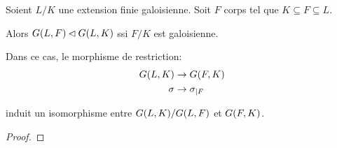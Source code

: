 \begin{proposition}
	Soient $L/K$ une extension finie galoisienne. Soit $F$ corps tel que $K
	\subseteq F \subseteq L$.

	Alors $G(L, F) \lhd G(L, K)$ ssi $F/K$ est
	galoisienne.

	Dans ce cas, le morphisme de restriction:
	\begin{align*}
		G(L, K) &\rightarrow G(F, K) \\
		\sigma &\rightarrow \sigma_{|F}
	\end{align*}

	induit un isomorphisme entre $G(L, K)/G(L, F)$ et
	$G(F, K)$.
\end{proposition}

\ifdefined\outputproof
\begin{proof}

\end{proof}
\fi

